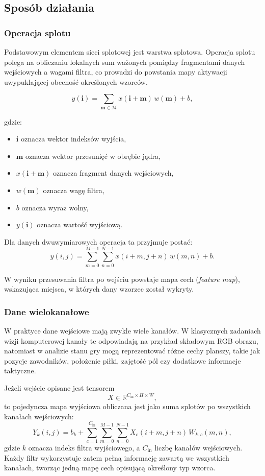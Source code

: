 \subsection{Sposób działania}

\subsubsection*{Operacja splotu}

Podstawowym elementem sieci splotowej jest warstwa splotowa. Operacja splotu polega na obliczaniu lokalnych sum ważonych pomiędzy fragmentami danych wejściowych a wagami filtra, co prowadzi do powstania mapy aktywacji uwypuklającej obecność określonych wzorców.

\[
y(\mathbf{i}) = \sum_{\mathbf{m} \in \mathcal{M}} x(\mathbf{i} + \mathbf{m}) \, w(\mathbf{m}) + b,
\]

gdzie:
\begin{itemize}
	\item $\mathbf{i}$ oznacza wektor indeksów wyjścia,
	\item $\mathbf{m}$ oznacza wektor przesunięć w obrębie jądra,
	\item $x(\mathbf{i} + \mathbf{m})$ oznacza fragment danych wejściowych,
	\item $w(\mathbf{m})$ oznacza wagę filtra,
	\item $b$ oznacza wyraz wolny,
	\item $y(\mathbf{i})$ oznacza wartość wyjściową.
\end{itemize}

Dla danych dwuwymiarowych operacja ta przyjmuje postać:
\[
y(i,j)=\sum_{m=0}^{M-1}\sum_{n=0}^{N-1}x(i+m,j+n)\,w(m,n)+b.
\]

W wyniku przesuwania filtra po wejściu powstaje mapa cech (\textit{feature map}), wskazująca miejsca, w których dany wzorzec został wykryty.

\subsubsection*{Dane wielokanałowe}

W praktyce dane wejściowe mają zwykle wiele kanałów. W klasycznych zadaniach wizji komputerowej kanały te odpowiadają na przykład składowym RGB obrazu, natomiast w analizie stanu gry mogą reprezentować różne cechy planszy, takie jak pozycje zawodników, położenie piłki, zajętość pól czy dodatkowe informacje taktyczne.

Jeżeli wejście opisane jest tensorem
\[
X \in \mathbb{R}^{C_{\mathrm{in}} \times H \times W},
\]
to pojedyncza mapa wyjściowa obliczana jest jako suma splotów po wszystkich kanałach wejściowych:
\[
Y_k(i,j)=b_k+\sum_{c=1}^{C_{\mathrm{in}}}\sum_{m=0}^{M-1}\sum_{n=0}^{N-1}
X_c(i+m,j+n)\,W_{k,c}(m,n),
\]
gdzie $k$ oznacza indeks filtra wyjściowego, a $C_{\mathrm{in}}$ liczbę kanałów wejściowych. Każdy filtr wykorzystuje zatem pełną informację zawartą we wszystkich kanałach, tworząc jedną mapę cech opisującą określony typ wzorca.

